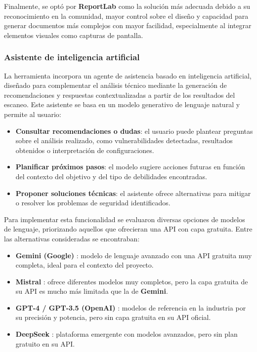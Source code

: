 \begin{parskipenv}
Finalmente, se optó por \textbf{ReportLab} como la solución más adecuada debido a su reconocimiento en la comunidad, mayor control sobre el diseño y capacidad para generar documentos más complejos con mayor facilidad, especialmente al integrar elementos visuales como capturas de pantalla.

\subsubsection*{Asistente de inteligencia artificial}
La herramienta incorpora un agente de asistencia basado en inteligencia artificial, diseñado para complementar el análisis técnico mediante la generación de recomendaciones y respuestas contextualizadas a partir de los resultados del escaneo. Este asistente se basa en un modelo generativo de lenguaje natural y permite al usuario:

\begin{itemize}
  \item \textbf{Consultar recomendaciones o dudas}: el usuario puede plantear preguntas sobre el análisis realizado, como vulnerabilidades detectadas, resultados obtenidos o interpretación de configuraciones.
  \item \textbf{Planificar próximos pasos}: el modelo sugiere acciones futuras en función del contexto del objetivo y del tipo de debilidades encontradas.
  \item \textbf{Proponer soluciones técnicas}: el asistente ofrece alternativas para mitigar o resolver los problemas de seguridad identificados.
\end{itemize}

Para implementar esta funcionalidad se evaluaron diversas opciones de modelos de lenguaje, priorizando aquellos que ofrecieran una API con capa gratuita. Entre las alternativas consideradas se encontraban:

\begin{itemize}
  \item \textbf{Gemini (Google)} \cite{gemini}: modelo de lenguaje avanzado con una API gratuita muy completa, ideal para el contexto del proyecto.
  \item \textbf{Mistral} \cite{mistral}: ofrece diferentes modelos muy completos, pero la capa gratuita de su API es mucho más limitada que la de \textbf{Gemini}.
  \item \textbf{GPT-4 / GPT-3.5 (OpenAI)} \cite{openai}: modelos de referencia en la industria por su precisión y potencia, pero sin capa gratuita en su API oficial.
  \item \textbf{DeepSeek} \cite{deepseek}: plataforma emergente con modelos avanzados, pero sin plan gratuito en su API.
\end{itemize}


\end{parskipenv}
